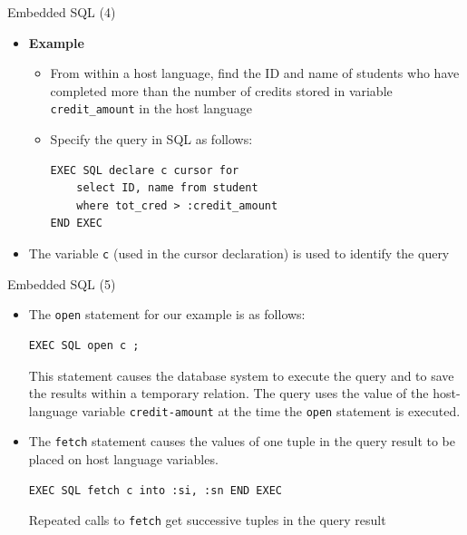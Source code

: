\documentclass[aspectratio=169, xcolor=dvipsnames]{beamer}
\begin{document}
\begin{frame}[fragile]{Embedded SQL (4)}
    \begin{itemize}
        \item \textbf{Example}
        \begin{itemize}
            \item From within a host language, find the ID and name of students who have completed more than the number of credits stored in variable \texttt{credit\_amount} in the host language
            \item Specify the query in SQL as follows:
            \begin{verbatim}
EXEC SQL declare c cursor for
    select ID, name from student
    where tot_cred > :credit_amount
END EXEC
            \end{verbatim}
        \end{itemize}
        \item The variable \texttt{c} (used in the cursor declaration) is used to identify the query
    \end{itemize}
\end{frame}

\begin{frame}[fragile]{Embedded SQL (5)}
    \begin{itemize}
        \item The \texttt{open} statement for our example is as follows:
        \begin{verbatim}
EXEC SQL open c ;
        \end{verbatim}
        This statement causes the database system to execute the query and to save the results within a temporary relation. The query uses the value of the host-language variable \texttt{credit-amount} at the time the \texttt{open} statement is executed.
        \item The \texttt{fetch} statement causes the values of one tuple in the query result to be placed on host language variables.
        \begin{verbatim}
EXEC SQL fetch c into :si, :sn END EXEC
        \end{verbatim}
        Repeated calls to \texttt{fetch} get successive tuples in the query result
    \end{itemize}
\end{frame}
\end{document}
